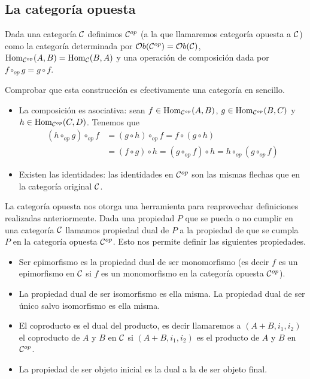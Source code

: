 \subsection{La categoría opuesta}
\begin{definition}
Dada una categoría $\mathcal{C}$ definimos
$\mathcal{C}^{op}$ (a la que llamaremos categoría opuesta a $\mathcal{C}$)
como la categoría determinada por $\mathcal{O}b(\mathcal{C}^{op}) = \mathcal{O}b(\mathcal{C})$,
$\operatorname{Hom}_{\mathcal{C}^{op}}(A, B) = \operatorname{Hom}_{\mathcal{C}}(B, A)$ y una operación de
composición dada por $f \circ_{op} g = g \circ f$.
\end{definition}

Comprobar que esta construcción es efectivamente una categoría
en sencillo.
\begin{itemize}
\item La composición es asociativa: sean
$f \in \operatorname{Hom}_{\mathcal{C}^{op}}(A, B)$, $g \in \operatorname{Hom}_{\mathcal{C}^{op}}(B, C)$
y $h \in \operatorname{Hom}_{\mathcal{C}^{op}}(C, D)$. Tenemos que
\begin{align*}
  (h \circ_{op} g) \circ_{op} f
    & = (g \circ h) \circ_{op} f
    = f \circ (g \circ h) \\
& = (f \circ g) \circ h
= (g \circ_{op} f)  \circ h
= h \circ_{op} (g \circ_{op} f)
\end{align*}
\item Existen las identidades: las identidades en $\mathcal{C}^{op}$
son las mismas flechas que en la categoría original $\mathcal{C}$.
\end{itemize}

La categoría opuesta nos otorga una herramienta para reaprovechar
definiciones realizadas anteriormente. Dada una propiedad $P$ que
se pueda o no cumplir en una categoría $\mathcal{C}$ llamamos propiedad
dual de $P$ a la propiedad de que se cumpla $P$ en la categoría opuesta
$\mathcal{C}^{op}$. Esto nos permite definir las siguientes propiedades.

\begin{itemize}
\item Ser epimorfismo es la propiedad dual de ser monomorfismo (es decir
$f$ es un epimorfismo en $\mathcal{C}$ si $f$ es un monomorfismo en la categoría opuesta
$\mathcal{C}^{op}$).
\item La propiedad dual de ser isomorfismo es ella misma. La propiedad
dual de ser único salvo isomorfismo es ella misma.
\item El coproducto es el dual del producto, es decir llamaremos
a $(A+B, i_1, i_2)$ el coproducto de $A$ y $B$ en $\mathcal{C}$ si
$(A+B, i_1, i_2)$ es el producto de $A$ y $B$ en $\mathcal{C}^{op}$.
\item La propiedad de ser objeto inicial es la dual a la de ser objeto final.
\end{itemize}

